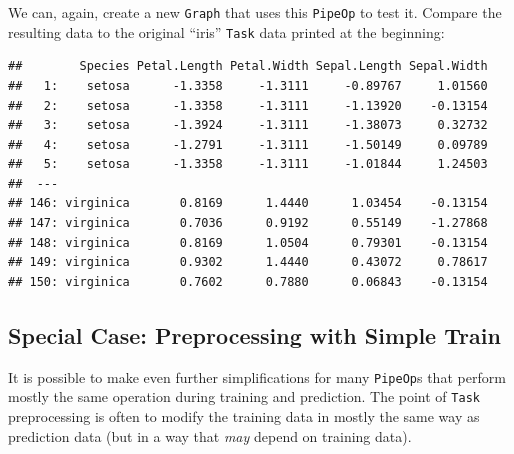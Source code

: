 \documentclass[]{scrbook}
\newenvironment{Shaded}{\begin{snugshade}}{\end{snugshade}}
\newcommand{\DecValTok}[1]{\textcolor[rgb]{0.00,0.00,0.81}{#1}}
\newcommand{\KeywordTok}[1]{\textcolor[rgb]{0.13,0.29,0.53}{\textbf{#1}}}
\newcommand{\NormalTok}[1]{#1}
\newcommand{\OperatorTok}[1]{\textcolor[rgb]{0.81,0.36,0.00}{\textbf{#1}}}
\newcommand{\StringTok}[1]{\textcolor[rgb]{0.31,0.60,0.02}{#1}}
\renewenvironment{Shaded} {\begin{snugshade}\small} {\end{snugshade}}
\begin{document}
We can, again, create a new \texttt{Graph} that uses this \texttt{PipeOp} to test it.
Compare the resulting data to the original ``iris'' \texttt{Task} data printed at the beginning:

\begin{Shaded}
\end{Shaded}

\begin{verbatim}
##        Species Petal.Length Petal.Width Sepal.Length Sepal.Width
##   1:    setosa      -1.3358     -1.3111     -0.89767     1.01560
##   2:    setosa      -1.3358     -1.3111     -1.13920    -0.13154
##   3:    setosa      -1.3924     -1.3111     -1.38073     0.32732
##   4:    setosa      -1.2791     -1.3111     -1.50149     0.09789
##   5:    setosa      -1.3358     -1.3111     -1.01844     1.24503
##  ---                                                            
## 146: virginica       0.8169      1.4440      1.03454    -0.13154
## 147: virginica       0.7036      0.9192      0.55149    -1.27868
## 148: virginica       0.8169      1.0504      0.79301    -0.13154
## 149: virginica       0.9302      1.4440      0.43072     0.78617
## 150: virginica       0.7602      0.7880      0.06843    -0.13154
\end{verbatim}

\hypertarget{special-case-preprocessing-with-simple-train}{%
\subsection{Special Case: Preprocessing with Simple Train}\label{special-case-preprocessing-with-simple-train}}

It is possible to make even further simplifications for many \texttt{PipeOp}s that perform mostly the same operation during training and prediction.
The point of \texttt{Task} preprocessing is often to modify the training data in mostly the same way as prediction data (but in a way that \emph{may} depend on training data).
\end{document}
